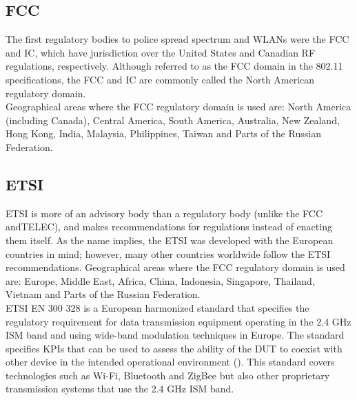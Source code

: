 \subsection{\acf{FCC}}
The first regulatory bodies to police spread spectrum and \acsp{WLAN} were the \acf{FCC} and  \acf{IC}, which have jurisdiction over the United States and Canadian \acs{RF} regulations, respectively. Although referred to as the \acs{FCC} domain in the 802.11 specifications, the \acs{FCC} and \acs{IC} are commonly called the North American regulatory domain. \\

Geographical areas where the \acs{FCC} regulatory domain is used are: North America (including Canada), Central America, South America, Australia, New Zealand, Hong Kong, India, Malaysia, Philippines, Taiwan and Parts of the Russian Federation.

\subsection{\acf{ETSI}}
\acs{ETSI} is more of an advisory body than a regulatory body (unlike the \acs{FCC} and\acs{TELEC}), and makes recommendations for regulations instead of enacting them itself. As the name implies, the \acs{ETSI} was developed with the European countries in mind; however, many other countries worldwide follow the \acs{ETSI} recommendations. Geographical areas where the \acs{FCC} regulatory domain is used are: Europe, Middle East, Africa, China, Indonesia, Singapore, Thailand, Vietnam and Parts of the Russian Federation. \\

\acs{ETSI} EN 300 328 is a European harmonized standard that specifies the regulatory requirement for data transmission equipment operating in the 2.4 GHz \acs{ISM} band and using wide-band modulation techniques in Europe. The standard specifies \acfp{KPI} that can be used to assess the ability of the \acs{DUT} to coexist with other device in the intended operational environment (\cite{7927764}). This standard covers technologies such as Wi-Fi\texttrademark{}, Bluetooth\textregistered{} and ZigBee but also other proprietary transmission systems that use the 2.4 GHz \acs{ISM} band.  \\

